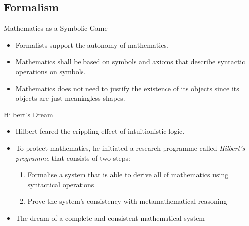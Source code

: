 \documentclass{beamer}
\begin{document}
\subsection{Formalism}
\begin{frame}{Mathematics as a Symbolic Game}
    \begin{itemize}[<+->]
	\item Formalists support the autonomy of mathematics.
	\item Mathematics shall be based on symbols and axioms that describe syntactic operations on symbols.
	\item Mathematics does not need to justify the existence of its objects since its objects are just meaningless shapes.
    \end{itemize}
\end{frame}
\begin{frame}{Hilbert's Dream}
    \begin{itemize}[<+->]
	\item Hilbert feared the crippling effect of intuitionistic logic.
	\item To protect mathematics, he initiated a research programme called \textit{Hilbert's programme} that consists of two steps:
	\begin{enumerate}
		\item Formalise a system that is able to derive all of mathematics using syntactical operations
		\item Prove the system's consistency with metamathematical reasoning
	\end{enumerate}
	\item The dream of a complete and consistent mathematical system
    \end{itemize}
\end{frame}
\end{document}
